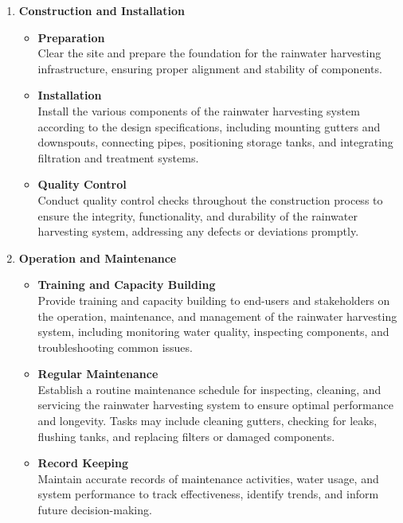 \documentclass[12pt]{article}
\begin{document}
\begin{enumerate}[label=\textbf{\arabic*.}]
		\item \textbf{Construction and Installation}
		\begin{itemize}
			\item \textbf{Preparation} \\
			Clear the site and prepare the foundation for the rainwater harvesting infrastructure, ensuring proper alignment and stability of components.
			\item \textbf{Installation} \\
			Install the various components of the rainwater harvesting system according to the design specifications, including mounting gutters and downspouts, connecting pipes, positioning storage tanks, and integrating filtration and treatment systems.
			\item \textbf{Quality Control} \\
			Conduct quality control checks throughout the construction process to ensure the integrity, functionality, and durability of the rainwater harvesting system, addressing any defects or deviations promptly.
		\end{itemize}

		\item \textbf{Operation and Maintenance}
		\begin{itemize}
			\item \textbf{Training and Capacity Building} \\
			Provide training and capacity building to end-users and stakeholders on the operation, maintenance, and management of the rainwater harvesting system, including monitoring water quality, inspecting components, and troubleshooting common issues.
			\item \textbf{Regular Maintenance} \\
			Establish a routine maintenance schedule for inspecting, cleaning, and servicing the rainwater harvesting system to ensure optimal performance and longevity. Tasks may include cleaning gutters, checking for leaks, flushing tanks, and replacing filters or damaged components.
			 \newpage
			\item \textbf{Record Keeping} \\
			Maintain accurate records of maintenance activities, water usage, and system performance to track effectiveness, identify trends, and inform future decision-making.
		\end{itemize}


\end{enumerate}
\end{document}
